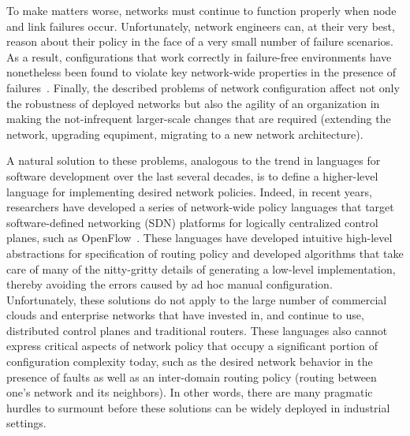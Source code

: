 To make matters worse, networks must continue to function properly when node and link failures occur.  
Unfortunately, network engineers
can, at their very best, reason about their policy in the face of a very small number of failure 
scenarios.  As a result, configurations that work
correctly in failure-free environments have nonetheless been found to violate key
network-wide properties in the presence of failures~\cite{batfish}.
Finally, the described problems of network configuration affect not only the robustness of deployed networks but also the agility of an organization in making the not-infrequent larger-scale changes that are required (extending the network, upgrading equpiment, migrating to a new network architecture).

A natural solution to these problems, analogous to the trend in languages for software development over the last several decades, is to define a higher-level language for implementing desired network policies.  
Indeed, in recent years, researchers have developed a series of network-wide policy 
languages that target  software-defined networking (SDN) platforms for logically centralized control planes, such as OpenFlow~\cite{frenetic,flowlog,foster:merlin,vericon,sagiv:l,fattire,netkat,kinetic,sdn-languages}. These languages have developed intuitive high-level abstractions for specification
of routing policy and developed algorithms that take care of many of the nitty-gritty details of
generating a low-level implementation, thereby avoiding the errors caused by
ad hoc manual configuration.
Unfortunately, these solutions do not apply to the large number of commercial clouds and 
enterprise networks that have invested in, and continue to use, distributed control planes and 
traditional routers.  These languages also cannot express critical aspects of network policy that occupy a significant portion of configuration complexity today, such as the desired network behavior in the presence of faults as well as an inter-domain routing policy (routing between one's network and its neighbors).  In other words, there are many pragmatic hurdles to surmount before
these solutions can be widely deployed in industrial settings.


